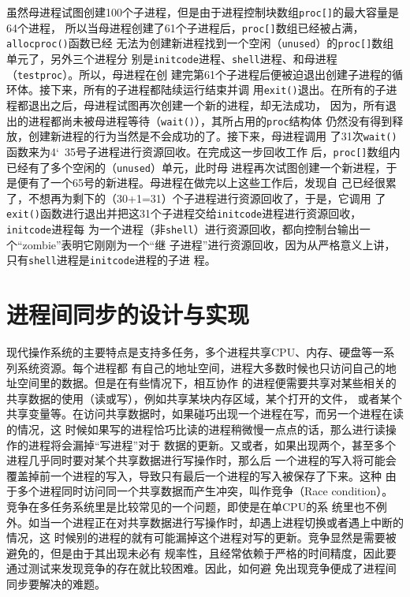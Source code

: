 \documentclass{swfuthesism}
\begin{document}
虽然母进程试图创建100个子进程，但是由于进程控制块数组\texttt{proc[]}的最大容量是64个进程，
所以当母进程创建了61个子进程后，\texttt{proc[]}数组已经被占满，\texttt{allocproc()}函数已经
无法为创建新进程找到一个空闲（\texttt{unused}）的\texttt{proc[]}数组单元了，另外三个进程分
别是\texttt{initcode}进程、\texttt{shell}进程、和母进程（\texttt{testproc}）。所以，母进程在创
建完第61个子进程后便被迫退出创建子进程的循环体。接下来，所有的子进程都陆续运行结束并调
用\texttt{exit()}退出。在所有的子进程都退出之后，母进程试图再次创建一个新的进程，却无法成功，
因为，所有退出的进程都尚未被母进程等待（\texttt{wait()}），其所占用的\texttt{proc}结构体
仍然没有得到释放，创建新进程的行为当然是不会成功的了。接下来，母进程调用
了31次\texttt{wait()}函数来为4\char`~35号子进程进行资源回收。在完成这一步回收工作
后，\texttt{proc[]}数组内已经有了多个空闲的（\texttt{unused}）单元，此时母
进程再次试图创建一个新进程，于是便有了一个65号的新进程。母进程在做完以上这些工作后，发现自
己已经很累了，不想再为剩下的（30+1=31）个子进程进行资源回收了，于是，它调用
了\texttt{exit()}函数进行退出并把这31个子进程交给\texttt{initcode}进程进行资源回收，\texttt{initcode}进程每
为一个进程（非\texttt{shell}）进行资源回收，都向控制台输出一个``zombie''表明它刚刚为一个``继
子进程''进行资源回收，因为从严格意义上讲，只有\texttt{shell}进程是\texttt{initcode}进程的子进
程。

\section{进程间同步的设计与实现}

现代操作系统的主要特点是支持多任务，多个进程共享CPU、内存、硬盘等一系列系统资源。每个进程都
有自己的地址空间，进程大多数时候也只访问自己的地址空间里的数据。但是在有些情况下，相互协作
的进程便需要共享对某些相关的共享数据的使用（读或写），例如共享某块内存区域，某个打开的文件，
或者某个共享变量等。在访问共享数据时，如果碰巧出现一个进程在写，而另一个进程在读的情况，这
时候如果写的进程恰巧比读的进程稍微慢一点点的话，那么进行读操作的进程将会漏掉``写进程''对于
数据的更新。又或者，如果出现两个，甚至多个进程几乎同时要对某个共享数据进行写操作时，那么后
一个进程的写入将可能会覆盖掉前一个进程的写入，导致只有最后一个进程的写入被保存了下来。这种
由于多个进程同时访问同一个共享数据而产生冲突，叫作竞争（Race
condition）\cite{TAHanzinger04}。竞争在多任务系统里是比较常见的一个问题，即使是在单CPU的系
统里也不例外。如当一个进程正在对共享数据进行写操作时，却遇上进程切换或者遇上中断的情况，这
时候别的进程的就有可能漏掉这个进程对写的更新。竞争显然是需要被避免的，但是由于其出现未必有
规率性，且经常依赖于严格的时间精度，因此要通过测试来发现竞争的存在就比较困难。因此，如何避
免出现竞争便成了进程间同步要解决的难题。
\end{document}

